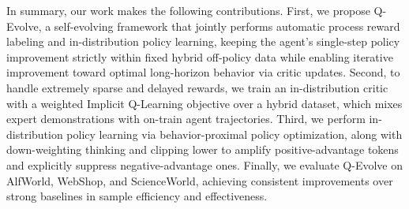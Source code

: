 \documentclass{article}
\newcommand{\zf}[1]{\textcolor{MyDarkRed}{[zf: #1]}}
\theoremstyle{plain}
\theoremstyle{definition}
\theoremstyle{remark}
\begin{document}
In summary, our work makes the following contributions. First, we propose Q-Evolve, a self-evolving framework that jointly performs automatic process reward labeling and in-distribution policy learning, keeping the agent's single-step policy improvement strictly within fixed hybrid off-policy data while enabling iterative improvement toward optimal long-horizon behavior via critic updates. Second, to handle extremely sparse and delayed rewards, we train an in-distribution critic with a weighted Implicit Q-Learning objective over a hybrid dataset, which mixes expert demonstrations with on-train agent trajectories.
Third, we perform in-distribution policy learning via behavior-proximal policy optimization, along with down-weighting thinking and clipping lower to amplify positive-advantage tokens and explicitly suppress negative-advantage ones.
Finally, we evaluate Q-Evolve on AlfWorld, WebShop, and ScienceWorld, achieving consistent improvements over strong baselines in sample efficiency and effectiveness.






\end{document}
